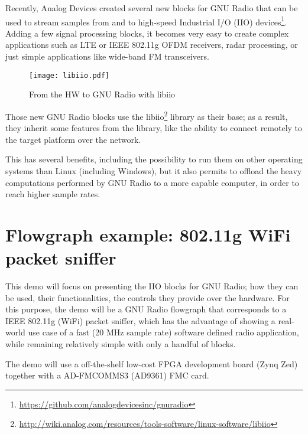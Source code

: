 \documentclass{acm_proc_article-sp}
\begin{document}
Recently, Analog Devices created several new blocks for GNU Radio that can be
used to stream samples from and to high-speed Industrial I/O (IIO)
devices\footnote{\url{https://github.com/analogdevicesinc/gnuradio}}.
Adding a few signal processing
blocks, it becomes very easy to create complex applications such as
LTE or IEEE 802.11g OFDM receivers, radar processing, or just simple
applications like wide-band FM transceivers.

\begin{figure}[htbp]
\centering
\texttt{[image: libiio.pdf]}
\caption{From the HW to GNU Radio with libiio}
\end{figure}

Those new GNU Radio blocks use the
libiio\footnote{\url{http://wiki.analog.com/resources/tools-software/linux-software/libiio}}
library as their base; as a result,
they inherit some features from the library, like the ability to connect
remotely to the target platform over the network.

This has several benefits, including the possibility to run them on other
operating systems than Linux (including Windows), but it also permits to
offload the heavy computations performed by GNU Radio to a more capable computer,
in order to reach higher sample rates.

\section{Flowgraph example: 802.11g WiFi packet sniffer}

This demo will focus on presenting the IIO blocks for GNU Radio; how they can be
used, their functionalities, the controls they provide over the hardware.
For this purpose, the demo will be a GNU Radio flowgraph that corresponds to a
IEEE 802.11g (WiFi) packet sniffer, which has the advantage of showing a
real-world use case of a fast (20 MHz sample rate) software defined radio
application, while remaining relatively simple with only a handful of blocks.

The demo will use a off-the-shelf low-cost FPGA development board (Zynq Zed)
together with a AD-FMCOMMS3 (AD9361) FMC card.

\balancecolumns
\end{document}
